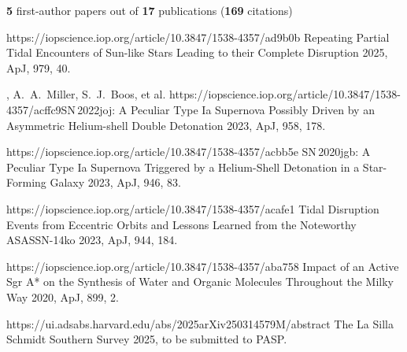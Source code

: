 


\begin{cvpubs}

\cvpub
{ %
{\bf 5} first-author papers out of {\bf 17} publications ({\bf 169} citations)
}
\cvpub
{ %
\begin{cvitems}
    \item {}
    {}
    {https://iopscience.iop.org/article/10.3847/1538-4357/ad9b0b}
    {Repeating Partial Tidal Encounters of Sun-like Stars Leading to their Complete Disruption}
    {2025, ApJ, 979, 40.}
    \item \cvsubpub
    {\Cliu, A.~A.~Miller, S.~J.~Boos, et al.}
    {}
    {https://iopscience.iop.org/article/10.3847/1538-4357/acffc9}{SN\,2022joj: A Peculiar Type Ia Supernova Possibly Driven by an Asymmetric Helium-shell Double Detonation}
    {2023, ApJ, 958, 178.}
    \item {}
    {}
    {https://iopscience.iop.org/article/10.3847/1538-4357/acbb5e}
    {SN\,2020jgb: A Peculiar Type Ia Supernova Triggered by a Helium-Shell Detonation in a Star-Forming Galaxy}
    {2023, ApJ, 946, 83.}
    \item {}
    {}
    {https://iopscience.iop.org/article/10.3847/1538-4357/acafe1}
    {Tidal Disruption Events from Eccentric Orbits and Lessons Learned from the Noteworthy ASASSN-14ko}
    {2023, ApJ, 944, 184.}
    \item {}
    {}
    {https://iopscience.iop.org/article/10.3847/1538-4357/aba758}
    {Impact of an Active Sgr A* on the Synthesis of Water and Organic Molecules Throughout the Milky Way}
    {2020, ApJ, 899, 2.}
    \item {}
    {\Cliu}
    {https://ui.adsabs.harvard.edu/abs/2025arXiv250314579M/abstract}
    {The La Silla Schmidt Southern Survey}
    {2025, to be submitted to PASP.}

\end{cvitems}}
\end{cvpubs}

